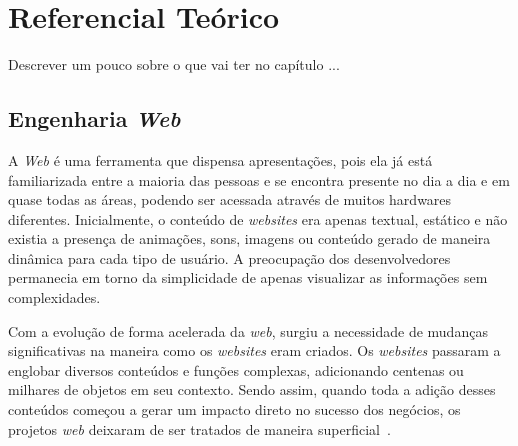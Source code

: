 \chapter{Referencial Teórico}
\label{sec-referencial}

Descrever um pouco sobre o que vai ter no capítulo ...

\section{Engenharia \textit{Web}}
\label{sec-ref-engenharia-web}


A \textit{Web} é uma ferramenta que dispensa apresentações, pois ela já está familiarizada entre a maioria das pessoas e se encontra presente no dia a dia e em quase todas as áreas, podendo ser acessada através de muitos hardwares diferentes. Inicialmente, o conteúdo de \textit{websites} era apenas textual, estático e não existia a presença de animações, sons, imagens ou conteúdo gerado de maneira dinâmica para cada tipo de usuário. A preocupação dos desenvolvedores permanecia em torno da simplicidade de apenas visualizar as informações sem complexidades.

Com a evolução de forma acelerada da \textit{web}, surgiu a necessidade de mudanças significativas na maneira como os \textit{websites} eram criados. Os \textit{websites} passaram a englobar diversos conteúdos e funções complexas, adicionando centenas ou milhares de objetos em seu contexto. Sendo assim, quando toda a adição desses conteúdos começou a gerar um impacto direto no sucesso dos negócios, os projetos \textit{web} deixaram de ser tratados de maneira superficial~\cite{pressman:es11}. 	







       